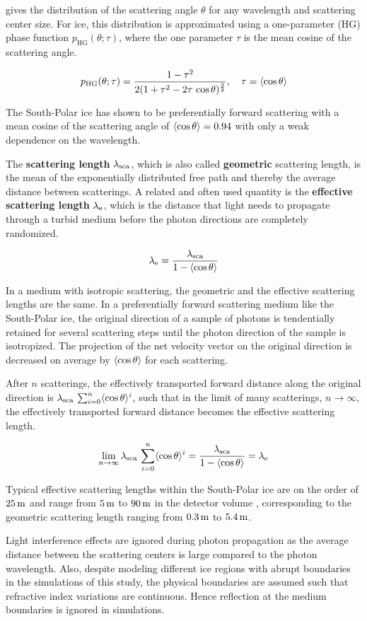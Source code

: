  gives the distribution of the scattering angle
\(\theta\) for any wavelength and scattering center size. For ice, this
distribution is approximated using a one-parameter
 (HG) phase function
\(p_\text{HG}(\theta; \tau)\), where the one parameter \(\tau\) is the
mean cosine of the scattering angle. \cite{lundberg}

\[ p_\text{HG}(\theta; \tau) = \frac{1 - \tau^2}{2(1 + \tau^2 - 2\tau\, \cos \theta)^\frac{3}{2}}, \ \ \ \tau = \langle \cos \theta \rangle \]

The South-Polar ice has shown to be preferentially forward scattering
with a mean cosine of the scattering angle of \(\langle \cos \theta \rangle = 0.94\)
with only a weak dependence on the wavelength. \cite{ackermann}

The \textbf{scattering length} \(\lambda_\text{sca}\), which is also called
\textbf{geometric} scattering length, is the mean of the exponentially
distributed free path and thereby the average distance between
scatterings. \cite{ackermann} A related and often used quantity is the
\textbf{effective scattering length} \(\lambda_\text{e}\), which is the
distance that light needs to propagate through a turbid medium before
the photon directions are completely randomized. \cite{lundberg}

\begin{equation}
  \lambda_\text{e} = \frac{\lambda_\text{sca}}{1 - \langle \cos \theta \rangle}
\end{equation}

In a medium with isotropic scattering, the geometric and the effective
scattering lengths are the same. In a preferentially forward scattering
medium like the South-Polar ice, the original direction of a sample of
photons is tendentially retained for several scattering steps until the
photon direction of the sample is isotropized. The projection of the net
velocity vector on the original direction is decreased on average by
\(\langle \cos \theta \rangle\) for each scattering. \cite{lundberg}

After \(n\) scatterings, the effectively transported forward distance
along the original direction is
\(\lambda_\text{sca}\,\sum_{i=0}^n \langle \cos \theta \rangle^i\), such that in the limit of
many scatterings, \(n \rightarrow \infty\), the effectively transported
forward distance becomes the effective scattering length.
\cite{lundberg, ackermann}

\[ \lim_{n \rightarrow \infty} \lambda_\text{sca}\,\sum_{i=0}^n \langle \cos \theta \rangle^i = \frac{\lambda_\text{sca}}{1 - \langle \cos \theta \rangle} = \lambda_\text{e} \]

Typical effective scattering lengths within the South-Polar ice are on
the order of \(25\text{\,m}\) \cite{lundberg} and range from \(5\text{\,m}\) to \(90\text{\,m}\)
in the detector volume \cite{icepaper}, corresponding to the geometric
scattering length ranging from \(0.3\text{\,m}\) to \(5.4\text{\,m}\).

Light interference effects are ignored during photon propagation as the
average distance between the scattering centers is large compared to the
photon wavelength. \cite{ackermann} Also, despite modeling different ice
regions with abrupt boundaries in the simulations of this study, the
physical boundaries are assumed such that refractive index variations
are continuous. Hence reflection at the medium boundaries is ignored in
simulations. \cite{lundberg}
